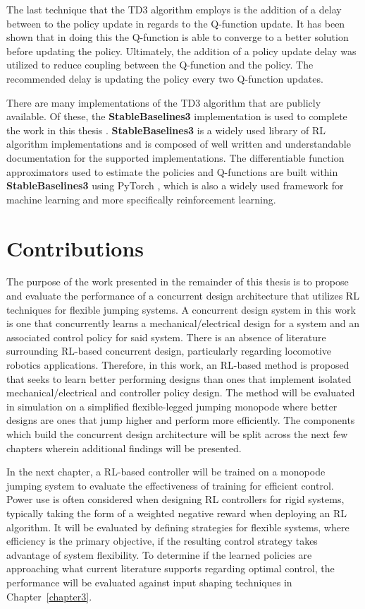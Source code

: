 The last technique that the TD3 algorithm employs is the addition of a delay between to the policy update in regards to the Q-function update. It has been shown that in doing this the Q-function is able to converge to a better solution before updating the policy. Ultimately, the addition of a policy update delay was utilized to reduce coupling between the Q-function and the policy. The recommended delay is updating the policy every two Q-function updates.

There are many implementations of the TD3 algorithm that are publicly available. Of these, the \textbf{\textbf{StableBaselines3}} implementation is used to complete the work in this thesis \cite{stable-baselines3}. \textbf{\textbf{StableBaselines3}} is a widely used library of RL algorithm implementations and is composed of well written and understandable documentation for the supported implementations. The differentiable function approximators used to estimate the policies and Q-functions are built within \textbf{StableBaselines3} using PyTorch \cite{NEURIPS2019_9015}, which is also a widely used framework for machine learning and more specifically reinforcement learning. 

\section{Contributions}

The purpose of the work presented in the remainder of this thesis is to propose and evaluate the performance of a concurrent design architecture that utilizes RL techniques for flexible jumping systems. A concurrent design system in this work is one that concurrently learns a mechanical/electrical design for a system and an associated control policy for said system. There is an absence of literature surrounding RL-based concurrent design, particularly regarding locomotive robotics applications. Therefore, in this work, an RL-based method is proposed that seeks to learn better performing designs than ones that implement isolated mechanical/electrical and controller policy design. The method will be evaluated in simulation on a simplified flexible-legged jumping monopode where better designs are ones that jump higher and perform more efficiently. The components which build the concurrent design architecture will be split across the next few chapters wherein additional findings will be presented.

In the next chapter, a RL-based controller will be trained on a monopode jumping system to evaluate the effectiveness of training for efficient control. Power use is often considered when designing RL controllers for rigid systems, typically taking the form of a weighted negative reward when deploying an RL algorithm. It will be evaluated by defining strategies for flexible systems, where efficiency is the primary objective, if the resulting control strategy takes advantage of system flexibility. To determine if the learned policies are approaching what current literature supports regarding optimal control, the performance will be evaluated against input shaping techniques in Chapter~\ref{chapter3}.

